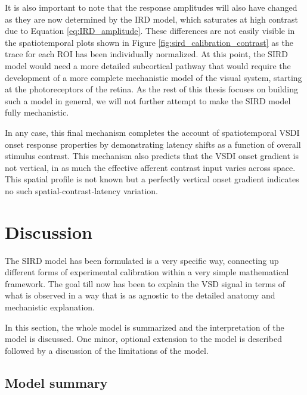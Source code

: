 \documentclass[phd,ianc,twoside]{infthesis}
\begin{document}
It is also important to note that the response amplitudes will also have
changed as they are now determined by the IRD model, which saturates at
high contrast due to Equation \ref{eq:IRD_amplitude}. These differences
are not easily visible in the spatiotemporal plots shown in Figure
\ref{fig:sird_calibration_contrast} as the trace for each ROI has been
individually normalized. At this point, the SIRD model would need a more
detailed subcortical pathway that would require the development of a
more complete mechanistic model of the visual system, starting at the
photoreceptors of the retina.  As the rest of this thesis focuses on
building such a model in general, we will not further attempt to make
the SIRD model fully mechanistic.

In any case, this final mechanism completes the account of spatiotemporal VSDI onset
response properties by demonstrating latency shifts as a function of
overall stimulus contrast. This mechanism also predicts that the VSDI
onset gradient is not vertical, in as much the effective afferent
contrast input varies across space. This spatial profile is not known
but a perfectly vertical onset gradient indicates no such
spatial-contrast-latency variation.

\section{Discussion}

The SIRD model has been formulated is a very specific way, connecting up
different forms of experimental calibration within a very simple
mathematical framework. The goal till now has been to explain the VSD
signal in terms of what is observed in a way that is as agnostic to the
detailed anatomy and mechanistic explanation.

In this section, the whole model is summarized and the interpretation of
the model is discussed. One minor, optional extension to the model is
described followed by a discussion of the limitations of the model.



\subsection{Model summary}
\label{section:model_summary}
\end{document}
